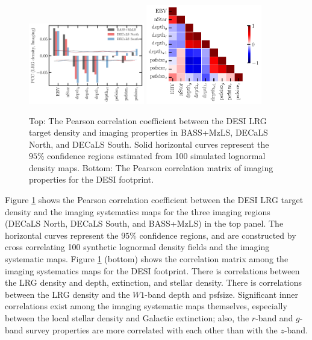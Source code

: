 \begin{figure}
\centering
 \includegraphics[width=0.45\textwidth]{figures/pcc.pdf} 
 \includegraphics[width=0.45\textwidth]{figures/pccx.pdf}  
 \caption{Top: The Pearson correlation coefficient between the DESI LRG target density and imaging properties in BASS+MzLS, DECaLS North, and DECaLS South. Solid horizontal curves represent the $95\%$ confidence regions estimated from 100 simulated lognormal density maps. Bottom: The Pearson correlation matrix of imaging properties for the DESI footprint.}
 \label{fig:pcc}
\end{figure}

Figure \ref{fig:pcc} shows the Pearson correlation coefficient between the DESI LRG target density and the imaging systematics maps for the three imaging regions (DECaLS North, DECaLS South, and BASS+MzLS) in the top panel. The horizontal curves represent the $95\%$ confidence regions, and are constructed by cross correlating 100 synthetic lognormal density fields and the imaging systematic maps. Figure \ref{fig:pcc} (bottom) shows the correlation matrix among the imaging systematics maps for the DESI footprint. There is  correlations between the LRG density and depth, extinction, and stellar density. There is  correlations between the LRG density and the $W1$-band depth and psfsize. Significant inner correlations exist among the imaging systematic maps themselves, especially between the local stellar density and Galactic extinction; also, the $r$-band and $g$-band survey properties are more correlated with each other than with the $z$-band.  


